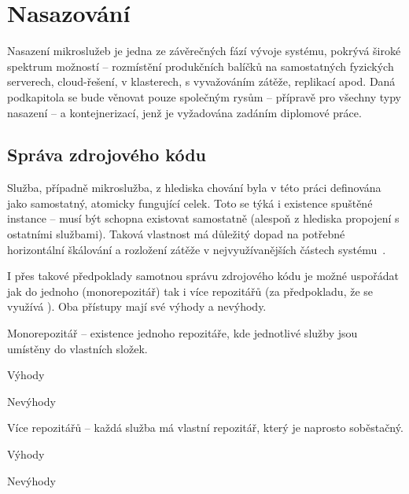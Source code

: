 \section{Nasazování}\label{sec:msa-deployment}

Nasazení mikroslužeb je jedna ze závěrečných fází vývoje systému, pokrývá široké spektrum možností – rozmístění produkčních balíčků na samostatných fyzických serverech, cloud-řešení, v klasterech, s vyvažováním zátěže, replikací apod.
Daná podkapitola se bude věnovat pouze společným rysům – přípravě pro všechny typy nasazení – a kontejnerizací, jenž je vyžadována zadáním diplomové práce.


\subsection{Správa zdrojového kódu}\label{subsec:msa-deployment-code}

Služba, případně mikroslužba, z hlediska chování byla v této práci definována jako samostatný, atomicky fungující celek.
Toto se týká i existence spuštěné instance – musí být schopna existovat samostatně (alespoň z hlediska propojení s ostatními službami).
Taková vlastnost má důležitý dopad na potřebné horizontální škálování a rozložení zátěže v nejvyužívanějších částech systému~\cite{monomulti}.

I přes takové předpoklady samotnou správu zdrojového kódu je možné uspořádat jak do jednoho (monorepozitář) tak i více repozitářů (za předpokladu, že se využívá ).
Oba přístupy mají své výhody a nevýhody.


\begin{dl}
   \item[Monorepozitář] – existence jednoho repozitáře, kde jednotlivé služby jsou umístěny do vlastních složek.

   Výhody
   \begin{ul}
      \item
   \end{ul}

   Nevýhody
   \begin{ul}
      \item
   \end{ul}

   \item[Více repozitářů] – každá služba má vlastní repozitář, který je naprosto soběstačný.

   Výhody
   \begin{ul}
      \item
   \end{ul}

   Nevýhody
   \begin{ul}
      \item
   \end{ul}
\end{dl}




